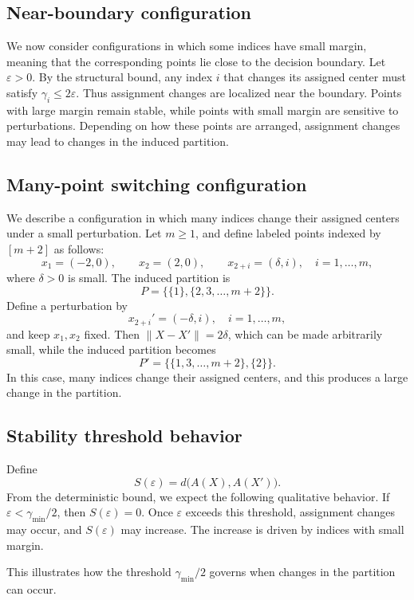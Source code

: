 \documentclass[11pt]{amsart}
\theoremstyle{plain}
\theoremstyle{definition}
\begin{document}
\subsection{Near-boundary configuration}

We now consider configurations in which some indices have small margin, meaning that the corresponding points lie close to the decision boundary. Let $\varepsilon > 0$. By the structural bound, any index $i$ that changes its assigned center must satisfy
$\gamma_i \le 2\varepsilon.$
Thus assignment changes are localized near the boundary. Points with large margin remain stable, while points with small margin are sensitive to perturbations. Depending on how these points are arranged, assignment changes may lead to changes in the induced partition.

\subsection{Many-point switching configuration}

We describe a configuration in which many indices change their assigned centers under a small perturbation. Let $m \ge 1$, and define labeled points indexed by $[m+2]$ as follows:
\[
x_1 = (-2,0), \qquad x_2 = (2,0), \qquad x_{2+i} = (\delta,i), \quad i=1,\ldots,m,
\]
where $\delta > 0$ is small. The induced partition is
\[
P = \{\{1\}, \{2,3,\ldots,m+2\}\}.
\]
Define a perturbation by
\[
x_{2+i}' = (-\delta,i), \quad i=1,\ldots,m,
\]
and keep $x_1,x_2$ fixed. Then $\|X - X'\| = 2\delta$, which can be made arbitrarily small, while the induced partition becomes
\[
P' = \{\{1,3,\ldots,m+2\}, \{2\}\}.
\]
In this case, many indices change their assigned centers, and this produces a large change in the partition.

\subsection{Stability threshold behavior}

Define
\[
S(\varepsilon) = d\big(A(X), A(X')\big).
\]
From the deterministic bound, we expect the following qualitative behavior. If $\varepsilon < \gamma_{\min}/2$, then $S(\varepsilon) = 0$. Once $\varepsilon$ exceeds this threshold, assignment changes may occur, and $S(\varepsilon)$ may increase. The increase is driven by indices with small margin.

This illustrates how the threshold $\gamma_{\min}/2$ governs when changes in the partition can occur.
\end{document}
